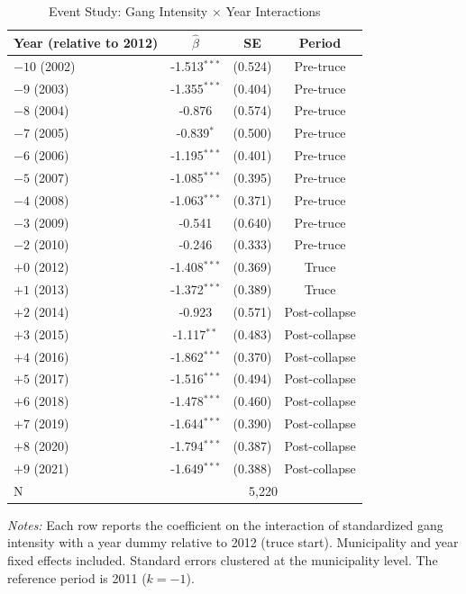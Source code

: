 \begin{table}[H]
\centering
\caption{Event Study: Gang Intensity $\times$ Year Interactions}
\label{tab:eventstudy}
\begin{threeparttable}
\begin{tabular}{lccc}
\toprule
Year (relative to 2012) & $\hat{\beta}$ & SE & Period \\
\midrule
$-10$ (2002) & -1.513$^{***}$ & (0.524) & Pre-truce \\
$-9$ (2003) & -1.355$^{***}$ & (0.404) & Pre-truce \\
$-8$ (2004) & -0.876 & (0.574) & Pre-truce \\
$-7$ (2005) & -0.839$^{*}$ & (0.500) & Pre-truce \\
$-6$ (2006) & -1.195$^{***}$ & (0.401) & Pre-truce \\
$-5$ (2007) & -1.085$^{***}$ & (0.395) & Pre-truce \\
$-4$ (2008) & -1.063$^{***}$ & (0.371) & Pre-truce \\
$-3$ (2009) & -0.541 & (0.640) & Pre-truce \\
$-2$ (2010) & -0.246 & (0.333) & Pre-truce \\
$+0$ (2012) & -1.408$^{***}$ & (0.369) & Truce \\
$+1$ (2013) & -1.372$^{***}$ & (0.389) & Truce \\
$+2$ (2014) & -0.923 & (0.571) & Post-collapse \\
$+3$ (2015) & -1.117$^{**}$ & (0.483) & Post-collapse \\
$+4$ (2016) & -1.862$^{***}$ & (0.370) & Post-collapse \\
$+5$ (2017) & -1.516$^{***}$ & (0.494) & Post-collapse \\
$+6$ (2018) & -1.478$^{***}$ & (0.460) & Post-collapse \\
$+7$ (2019) & -1.644$^{***}$ & (0.390) & Post-collapse \\
$+8$ (2020) & -1.794$^{***}$ & (0.387) & Post-collapse \\
$+9$ (2021) & -1.649$^{***}$ & (0.388) & Post-collapse \\
\midrule
N & \multicolumn{3}{c}{5,220} \\
\bottomrule
\end{tabular}
\begin{tablenotes}[flushleft]
\small
\item \textit{Notes:} Each row reports the coefficient on the interaction of standardized gang intensity with a year dummy relative to 2012 (truce start). Municipality and year fixed effects included. Standard errors clustered at the municipality level. The reference period is 2011 ($k = -1$).
\end{tablenotes}
\end{threeparttable}
\end{table}
